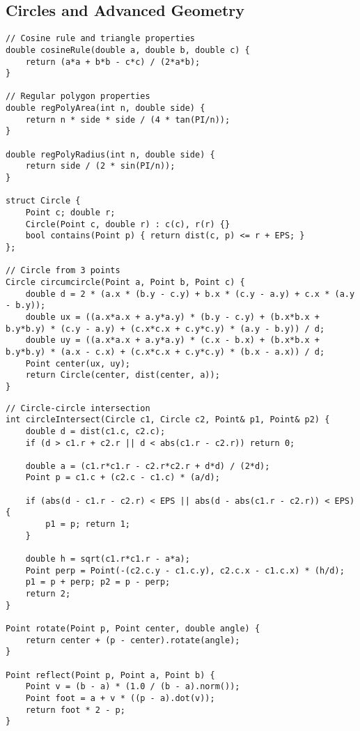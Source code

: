 \documentclass[11pt,a4paper]{article}
\begin{document}
\newpage

\subsection{Circles and Advanced Geometry}
\begin{lstlisting}[caption={Circle Operations and Properties}]
// Cosine rule and triangle properties
double cosineRule(double a, double b, double c) {
    return (a*a + b*b - c*c) / (2*a*b);
}

// Regular polygon properties
double regPolyArea(int n, double side) {
    return n * side * side / (4 * tan(PI/n));
}

double regPolyRadius(int n, double side) {
    return side / (2 * sin(PI/n));
}

struct Circle {
    Point c; double r;
    Circle(Point c, double r) : c(c), r(r) {}
    bool contains(Point p) { return dist(c, p) <= r + EPS; }
};

// Circle from 3 points
Circle circumcircle(Point a, Point b, Point c) {
    double d = 2 * (a.x * (b.y - c.y) + b.x * (c.y - a.y) + c.x * (a.y - b.y));
    double ux = ((a.x*a.x + a.y*a.y) * (b.y - c.y) + (b.x*b.x + b.y*b.y) * (c.y - a.y) + (c.x*c.x + c.y*c.y) * (a.y - b.y)) / d;
    double uy = ((a.x*a.x + a.y*a.y) * (c.x - b.x) + (b.x*b.x + b.y*b.y) * (a.x - c.x) + (c.x*c.x + c.y*c.y) * (b.x - a.x)) / d;
    Point center(ux, uy);
    return Circle(center, dist(center, a));
}
\end{lstlisting}

\newpage

\begin{lstlisting}[caption={Circle Intersection and Transformations}]
// Circle-circle intersection
int circleIntersect(Circle c1, Circle c2, Point& p1, Point& p2) {
    double d = dist(c1.c, c2.c);
    if (d > c1.r + c2.r || d < abs(c1.r - c2.r)) return 0;
    
    double a = (c1.r*c1.r - c2.r*c2.r + d*d) / (2*d);
    Point p = c1.c + (c2.c - c1.c) * (a/d);
    
    if (abs(d - c1.r - c2.r) < EPS || abs(d - abs(c1.r - c2.r)) < EPS) {
        p1 = p; return 1;
    }
    
    double h = sqrt(c1.r*c1.r - a*a);
    Point perp = Point(-(c2.c.y - c1.c.y), c2.c.x - c1.c.x) * (h/d);
    p1 = p + perp; p2 = p - perp;
    return 2;
}

Point rotate(Point p, Point center, double angle) {
    return center + (p - center).rotate(angle);
}

Point reflect(Point p, Point a, Point b) {
    Point v = (b - a) * (1.0 / (b - a).norm());
    Point foot = a + v * ((p - a).dot(v));
    return foot * 2 - p;
}
\end{lstlisting}
\end{document}
